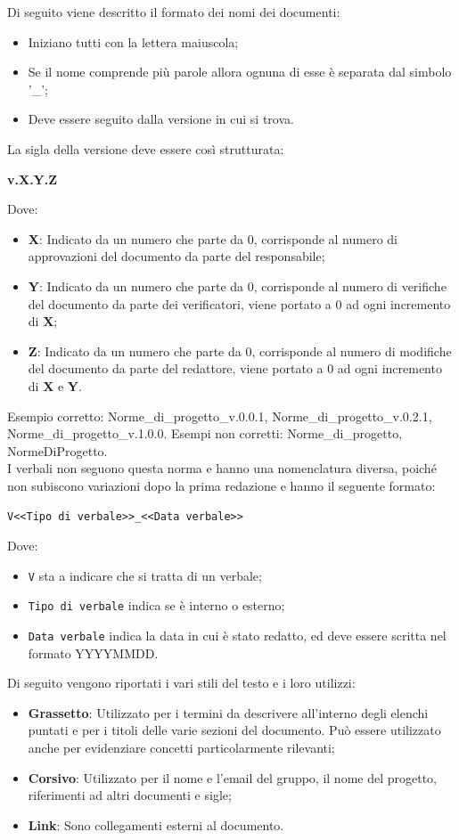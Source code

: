 Di seguito viene descritto il formato dei nomi dei documenti:
\begin{itemize}
\item Iniziano tutti con la lettera maiuscola;
\item Se il nome comprende più parole allora ognuna di esse è separata dal simbolo '\_';
\item Deve essere seguito dalla versione in cui si trova.
\end{itemize}
La sigla della versione deve essere così strutturata:
\begin{center}
    \large{\textbf{v.X.Y.Z}}
\end{center}
Dove:
\begin{itemize}
\item \textbf{X}: Indicato da un numero che parte da 0, corrisponde al numero di approvazioni del documento da parte del responsabile;
\item \textbf{Y}: Indicato da un numero che parte da 0, corrisponde al numero di verifiche del documento da parte dei verificatori, viene portato a 0 ad ogni incremento di \textbf{X};
\item \textbf{Z}: Indicato da un numero che parte da 0, corrisponde al numero di modifiche del documento da parte del redattore, viene portato a 0 ad ogni incremento di \textbf{X} e \textbf{Y}.
\end{itemize}
Esempio corretto: Norme\_di\_progetto\_v.0.0.1, Norme\_di\_progetto\_v.0.2.1, Norme\_di\_progetto\_v.1.0.0.
Esempi non corretti: Norme\_di\_progetto, NormeDiProgetto.\\
I verbali non seguono questa norma e hanno una nomenclatura diversa, poiché non subiscono variazioni dopo la prima redazione e hanno il seguente formato: 
\begin{center}
	\verb|V<<Tipo di verbale>>_<<Data verbale>>|
\end{center}
Dove:
\begin{itemize}
	\item \verb|V| sta a indicare che si tratta di un verbale;
	\item \verb|Tipo di verbale| indica se è interno o esterno;
	\item \verb|Data verbale| indica la data in cui è stato redatto, ed deve essere scritta nel formato YYYYMMDD.
\end{itemize}

Di seguito vengono riportati i vari stili del testo e i loro utilizzi:
\begin{itemize}
\item \textbf{Grassetto}: Utilizzato per i termini da descrivere all'interno degli elenchi puntati e per i titoli delle varie sezioni del documento. Può essere utilizzato anche per evidenziare concetti particolarmente rilevanti;
\item \textbf{Corsivo}: Utilizzato per il nome e l'email del gruppo, il nome del progetto, riferimenti ad altri documenti e sigle;
\item \textbf{Link}: Sono collegamenti esterni al documento.
\end{itemize}

